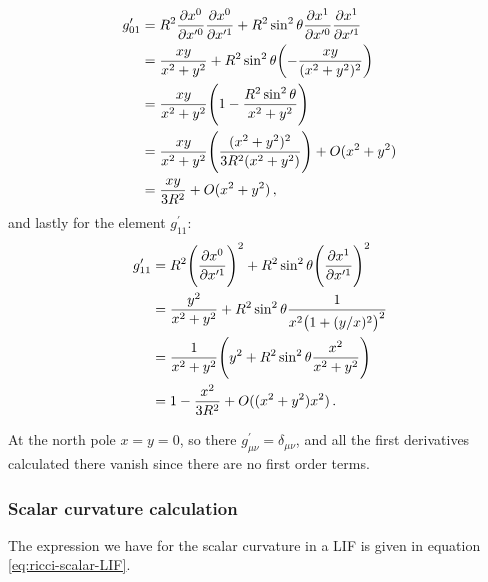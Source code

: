 \documentclass[main.tex]{subfiles}
\begin{document}
%
\begin{subequations}
\begin{align}
  g_{01}^{\prime } &= R^2 \pdv{x^{0}}{x^{\prime 0}} \pdv{x^{0}}{x^{\prime 1}} 
  + R^2 \sin^2 \theta \pdv{x^{1}}{x^{\prime 0}} \pdv{x^{1}}{x^{\prime 1}}  \\
  &= \frac{xy}{x^2+y^2} + R^2 \sin^2\theta \qty(- \frac{xy}{(x^2+y^2)^2})  \\
  &= \frac{xy}{x^2+y^2} \qty(1 - \frac{R^2 \sin^2\theta }{x^2+y^2})  \\
  &= \frac{xy}{x^2+y^2} \qty(\frac{(x^2+y^2)^2}{3R^2 (x^2+y^2)}) + O(x^2+y^2) \\
  &= \frac{xy}{3R^2} + O(x^2+y^2)
\,,
\end{align}
\end{subequations}
%
and lastly for the element \(g_{11}^{\prime }\): 
%
\begin{subequations}
\begin{align}
  g_{11}^{\prime } &=  R^2 \qty(\pdv{x^{0}}{x^{\prime 1}})^2
  + R^2 \sin^2 \theta \qty(\pdv{x^{1}}{x^{\prime 1}})^2  \\
  &= \frac{y^2}{x^2+y^2} + R^2 \sin^2 \theta \frac{1}{x^{2} \qty(1 + (y/x)^2)^2}  \\
  &= \frac{1}{x^2+y^2} \qty(y^2 +  R^2 \sin^2\theta \frac{x^2}{x^2+y^2})  \\
  &= 1 - \frac{x^2}{3R^2} + O ((x^2+y^2) x^2)
  \,.
\end{align}
\end{subequations}

At the north pole \(x=y=0\), so there \(g^{\prime }_{\mu \nu }= \delta_{\mu \nu }\), and all the first derivatives calculated there vanish since there are no first order terms.

\subsubsection{Scalar curvature calculation}

The expression we have for the scalar curvature in a LIF is given in equation \eqref{eq:ricci-scalar-LIF}.
\end{document}
